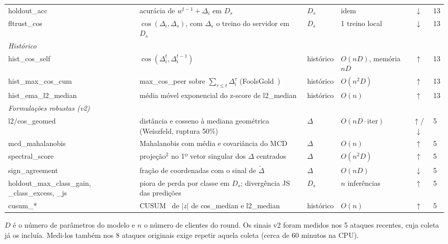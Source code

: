 \documentclass[11pt,a4paper]{article}
\begin{document}
\begin{center}
\begin{longtable}{p{2.5cm}p{6.1cm}p{1.9cm}p{2.5cm}cp{1.3cm}}
holdout\_acc & acurácia de $w^{t-1}+\Delta_i$ em $D_s$ & $D_s$ & idem & $\downarrow$ & 13 \\
\rowcolor{lightbg} fltrust\_cos & $\cos(\Delta_i, \Delta_s)$, com $\Delta_s$ o treino do servidor em $D_s$~\cite{fltrust} & $D_s$ & 1 treino local & $\downarrow$ & 13 \\
\multicolumn{6}{l}{\textit{Histórico}} \\
\rowcolor{lightbg} hist\_cos\_self & $\cos(\Delta_i^t, \Delta_i^{t-1})$ & histórico & $O(nD)$, memória $nD$ & $\uparrow$ & 13 \\
hist\_max\_cos\_cum & max\_cos\_peer sobre $\sum_{\tau \le t} \Delta_i^\tau$ (FoolsGold~\cite{foolsgold}) & histórico & $O(n^2D)$ & $\uparrow$ & 13 \\
\rowcolor{lightbg} hist\_ema\_\-l2\_median & média móvel exponencial do z-score de l2\_median & histórico & $O(n)$ & $\uparrow$ & 13 \\
\multicolumn{6}{l}{\textit{Formulações robustas (v2)}} \\
\rowcolor{lightbg} l2/cos\_geomed & distância e cosseno à mediana geométrica (Weiszfeld, ruptura 50\%) & $\Delta$ & $O(nD \cdot \text{iter})$ & $\uparrow$/$\downarrow$ & 5 \\
mcd\_mahalanobis & Mahalanobis com média e covariância do MCD~\cite{mcd} & $\Delta$ & $O(n)$ & $\uparrow$ & 5 \\
\rowcolor{lightbg} spectral\_score & projeção$^2$ no 1º vetor singular dos $\Delta$ centrados~\cite{spectral} & $\Delta$ & $O(n^2D)$ & $\uparrow$ & 5 \\
sign\_agreement & fração de coordenadas com o sinal de $\tilde\Delta$~\cite{signguard} & $\Delta$ & $O(nD)$ & $\downarrow$ & 5 \\
\rowcolor{lightbg} holdout\_max\_\-class\_gain, \_class\_\-excess, \_js & piora de perda por classe em $D_s$; divergência JS das predições & $D_s$ & $n$ inferências & $\uparrow$ & 5 \\
cusum\_* & CUSUM~\cite{cusum} de $|z|$ de cos\_median e l2\_median & histórico & $O(n)$ & $\uparrow$ & 5 \\
\bottomrule
\end{longtable}
\end{center}

\noindent $D$ é o número de parâmetros do modelo e $n$ o número de clientes do round. Os sinais v2 foram
medidos nos 5 ataques recentes, cuja coleta já os incluía. Medi-los também nos 8 ataques originais exige
repetir aquela coleta (cerca de 60 minutos na CPU).
\end{document}
